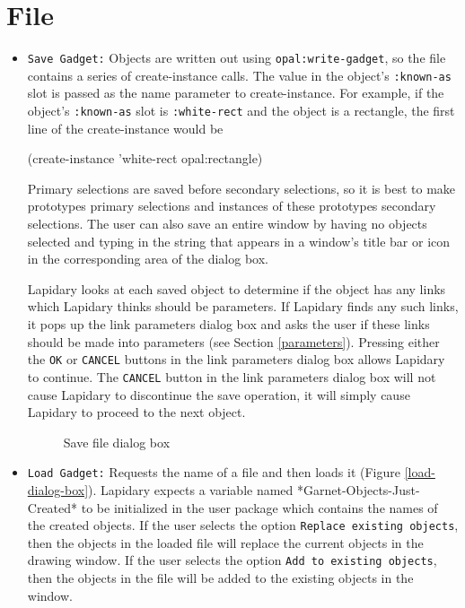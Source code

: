 \section{File}
\begin{itemize}
\item 
{\tt Save Gadget:} Objects are written out using {\tt opal:write-gadget},
so the file contains
a series of create-instance calls. The value in the object's {\tt :known-as}
slot is passed as the name parameter to create-instance. For example, if
the object's {\tt :known-as} slot is {\tt :white-rect} and the object is a
rectangle, the first line of the create-instance would be

\begin{programexample}
(create-instance 'white-rect opal:rectangle)
\end{programexample}

Primary selections are saved before secondary selections, so it is best to
make prototypes primary selections and instances of these prototypes secondary
selections.  The user can also save an entire window by having no
objects selected and typing in the string that appears in a window's title
bar or icon in the corresponding area of the dialog box.

Lapidary looks at each saved object to determine if the object has any
links which Lapidary thinks should be parameters. If Lapidary finds any
such links, it pops up the link parameters dialog box and asks the user
if these links should be made into parameters (see Section \ref{parameters}).
Pressing either the {\tt OK} or {\tt CANCEL} buttons in the link parameters
dialog box allows Lapidary to continue. The {\tt CANCEL} button in the
link parameters dialog box will not cause Lapidary to discontinue the save
operation, it will simply cause Lapidary to proceed to the next object.

\begin{figure}
\begin{center}
\end{center}
\caption{Save file dialog box}
\end{figure}


\item 
{\tt Load Gadget:} Requests the name of a file and then loads it
(Figure \ref{load-dialog-box}).
Lapidary expects a variable named *Garnet-Objects-Just-Created* to
be initialized in the user package which contains the names of
the created objects. If the user selects the option {\tt Replace existing
objects}, then the objects in the loaded file will replace the current
objects in the drawing window. If the user selects the option
{\tt Add to existing objects}, then the objects in the file will be
added to the existing objects in the window.


\end{itemize}
